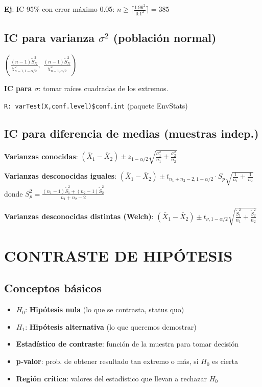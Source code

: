 \documentclass[9pt,a4paper]{article}
\newcommand{\R}{\texttt{R: }}
\begin{document}
\begin{multicols}{2}
\begin{exbox}
\textbf{Ej}: IC 95\% con error máximo 0.05: $n\geq\lceil\frac{1.96^2}{0.1^2}\rceil=385$
\end{exbox}

\subsection{IC para varianza $\sigma^2$ (población normal)}
\begin{formulabox}
$\left(\frac{(n-1)\tilde{S}^2_X}{\chi^2_{n-1,1-\alpha/2}},\;\frac{(n-1)\tilde{S}^2_X}{\chi^2_{n-1,\alpha/2}}\right)$
\end{formulabox}

\textbf{IC para $\sigma$}: tomar raíces cuadradas de los extremos.

\R\texttt{varTest(X,conf.level)\$conf.int} (paquete EnvStats)

\subsection{IC para diferencia de medias (muestras indep.)}
\textbf{Varianzas conocidas}:
$(\bar{X}_1-\bar{X}_2)\pm z_{1-\alpha/2}\sqrt{\frac{\sigma_1^2}{n_1}+\frac{\sigma_2^2}{n_2}}$

\textbf{Varianzas desconocidas iguales}:
$(\bar{X}_1-\bar{X}_2)\pm t_{n_1+n_2-2,1-\alpha/2}\cdot S_p\sqrt{\frac{1}{n_1}+\frac{1}{n_2}}$\\
donde $S_p^2=\frac{(n_1-1)\tilde{S}_1^2+(n_2-1)\tilde{S}_2^2}{n_1+n_2-2}$

\textbf{Varianzas desconocidas distintas (Welch)}:
$(\bar{X}_1-\bar{X}_2)\pm t_{\nu,1-\alpha/2}\sqrt{\frac{\tilde{S}_1^2}{n_1}+\frac{\tilde{S}_2^2}{n_2}}$

\section{CONTRASTE DE HIPÓTESIS}

\subsection{Conceptos básicos}
\begin{itemize}[leftmargin=*]
\item $H_0$: \textbf{Hipótesis nula} (lo que se contrasta, status quo)
\item $H_1$: \textbf{Hipótesis alternativa} (lo que queremos demostrar)
\item \textbf{Estadístico de contraste}: función de la muestra para tomar decisión
\item \textbf{p-valor}: prob. de obtener resultado tan extremo o más, si $H_0$ es cierta
\item \textbf{Región crítica}: valores del estadístico que llevan a rechazar $H_0$
\end{itemize}


\end{multicols}
\end{document}
